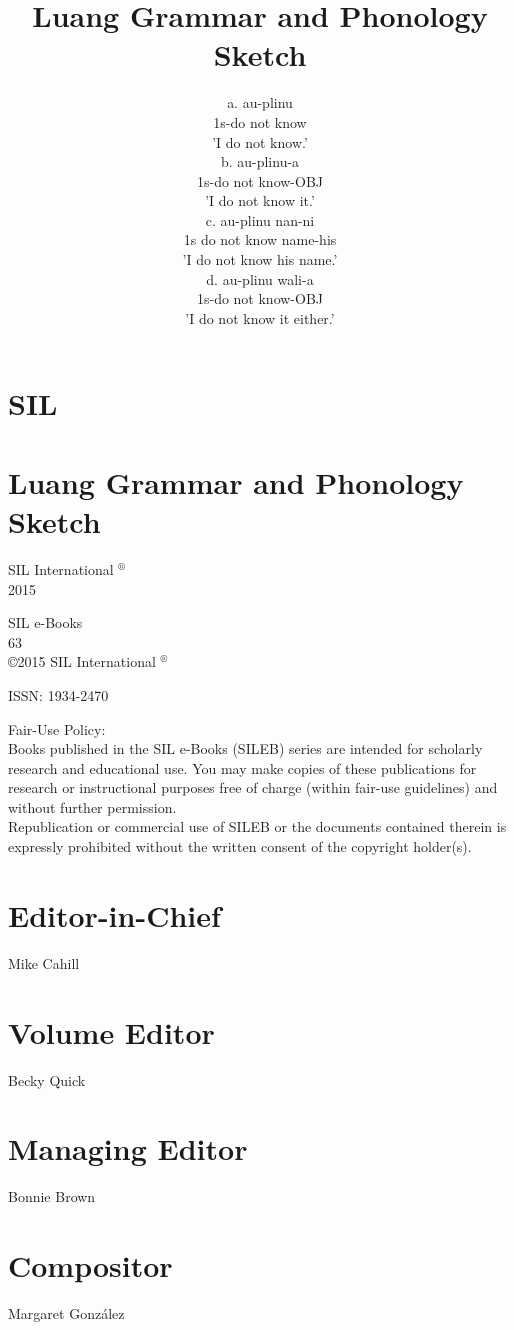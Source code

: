 \documentclass[10pt]{article}
\title{Luang Grammar and Phonology Sketch }
\author{a. au-plinu\\
1s-do not know\\
'I do not know.'\\
b. au-plinu-a\\
1s-do not know-OBJ\\
'I do not know it.'\\
c. au-plinu nan-ni\\
1s do not know name-his\\
'I do not know his name.'\\
d. au-plinu wali-a\\
1s-do not know-OBJ\\
'I do not know it either.'}
\date{}
\begin{document}
\maketitle
\captionsetup{singlelinecheck=false}
\section*{SIL}
\section*{Luang Grammar and Phonology Sketch}
SIL International \({ }^{\circledR}\)\\
2015

SIL e-Books\\
63\\
©2015 SIL International \({ }^{\circledR}\)

ISSN: 1934-2470

Fair-Use Policy:\\
Books published in the SIL e-Books (SILEB) series are intended for scholarly research and educational use. You may make copies of these publications for research or instructional purposes free of charge (within fair-use guidelines) and without further permission.\\
Republication or commercial use of SILEB or the documents contained therein is expressly prohibited without the written consent of the copyright holder(s).

\section*{Editor-in-Chief}
Mike Cahill

\section*{Volume Editor}
Becky Quick

\section*{Managing Editor}
Bonnie Brown

\section*{Compositor}
Margaret González
\end{document}
